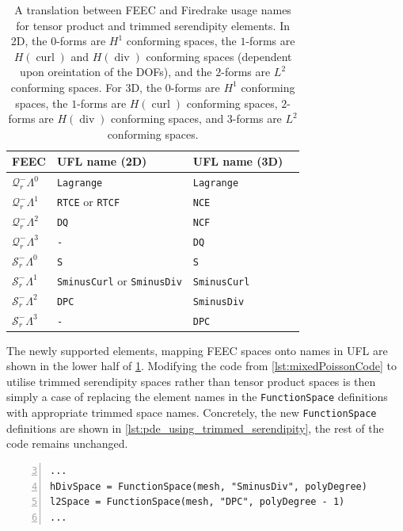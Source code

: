 \documentclass[format=acmsmall,screen,timestamp=false,a4paper]{acmart}
\DeclareMathOperator{\Div}{div}
\DeclareMathOperator{\curl}{curl}
\newcommand{\hcurl}{\ensuremath{{H}(\curl)}\xspace}
\newcommand{\hdiv}{\ensuremath{{H}(\Div)}\xspace}
\begin{document}
\begin{table}[htbp]
  \centering
  \caption{A translation between FEEC and Firedrake usage names for tensor product and trimmed serendipity elements.  In 2D, the $0$-forms are $H^1$ conforming spaces, the $1$-forms are \hcurl and \hdiv conforming spaces (dependent upon oreintation of the DOFs), and the $2$-forms are $L^2$ conforming spaces.  For 3D, the $0$-forms are $H^1$ conforming spaces, the $1$-forms are \hcurl conforming spaces, $2$-forms are \hdiv conforming spaces, and $3$-forms are $L^2$ conforming spaces.\label{tab:FiredrakeNames}}
\begin{tabular}{llll}
  \toprule
   FEEC & UFL name (2D) & UFL name (3D) \\
  \midrule
  $\mathcal{Q}^-_r \Lambda^0$ & \texttt{Lagrange} & \texttt{Lagrange}  \\
   $\mathcal{Q}^-_r \Lambda^1$ & \texttt{RTCE} or \texttt{RTCF} & \texttt{NCE} \\
   $\mathcal{Q}^-_r \Lambda^2$ & \texttt{DQ} & \texttt{NCF}  \\
  $\mathcal{Q}^-_r \Lambda^3$ & \texttt{-} & \texttt{DQ}\\
  \midrule
  $\mathcal{S}^-_r \Lambda^0 $ & \texttt{S} & \texttt{S}  \\
  $\mathcal{S}^-_r \Lambda^1$ & \texttt{SminusCurl} or \texttt{SminusDiv} & \texttt{SminusCurl}  \\
  $\mathcal{S}^-_r \Lambda^2$ & \texttt{DPC} & \texttt{SminusDiv}\\
  $\mathcal{S}^-_r \Lambda^3$ & \texttt{-} & \texttt{DPC}\\
  \bottomrule
\end{tabular}
\end{table}

The newly supported elements, mapping FEEC spaces onto names in UFL are shown in the lower half of \cref{tab:FiredrakeNames}. Modifying the code from \cref{lst:mixedPoissonCode} to utilise trimmed serendipity spaces rather than tensor product spaces is then simply a case of replacing the element names in the \texttt{FunctionSpace} definitions with appropriate trimmed space names. Concretely, the new \texttt{FunctionSpace} definitions are shown in \cref{lst:pde_using_trimmed_serendipity}, the rest of the code remains unchanged.
\begin{lstlisting}[float=htbp,caption={Setting up Firedrake to use the trimmed serendipity elements in a mixed Poisson problem in 3D.}, label={lst:pde_using_trimmed_serendipity}, numbers=left, firstnumber=3, xleftmargin=20pt,  xrightmargin=20pt]
...
hDivSpace = FunctionSpace(mesh, "SminusDiv", polyDegree)
l2Space = FunctionSpace(mesh, "DPC", polyDegree - 1)
...
\end{lstlisting}
\end{document}
